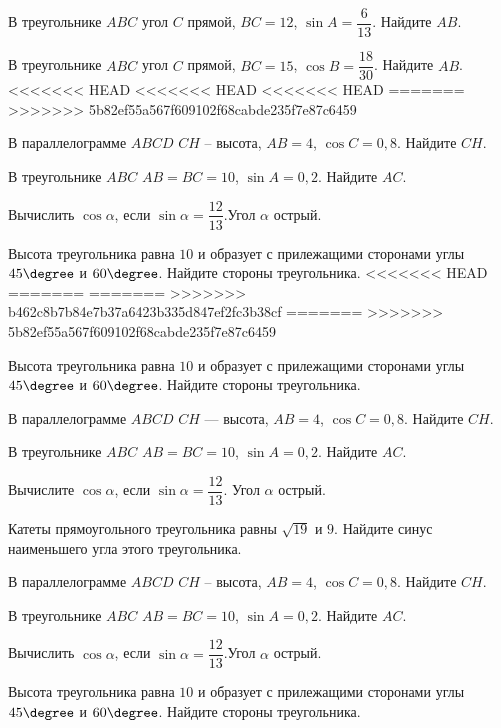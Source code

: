\begin{homework}[number=2]
	\begin{listofex}
		\item В треугольнике \( ABC \) угол \( C \) прямой, \( BC=12 \), \( \sin A=\dfrac{6}{13} \). Найдите \( AB \).
		\item В треугольнике \( ABC \) угол \( C \) прямой, \( BC=15 \), \( \cos B=\dfrac{18}{30} \). Найдите \( AB \).
<<<<<<< HEAD
<<<<<<< HEAD
<<<<<<< HEAD
=======
>>>>>>> 5b82ef55a567f609102f68cabde235f7e87c6459
		\item  В параллелограмме \( ABCD \) \( CH \) – высота, \( AB = 4 \), \( \cos C = 0,8 \). Найдите \( CH \).
		\item  В треугольнике \( ABC \) \( AB = BC = 10 \), \( \sin A = 0,2 \). Найдите \( AC \).
		\item Вычислить \( \cos \alpha \), если \( \sin \alpha =\dfrac{12}{13}\).Угол \( \alpha \) острый.
		\item  Высота треугольника равна \( 10 \) и образует с прилежащими сторонами углы \( 45\degree \) и \( 60\degree \). Найдите стороны треугольника.
<<<<<<< HEAD
=======
=======
>>>>>>> b462c8b7b84e7b37a6423b335d847ef2fc3b38cf
=======
>>>>>>> 5b82ef55a567f609102f68cabde235f7e87c6459
		\item  Высота треугольника равна \( 10 \) и образует с прилежащими сторонами углы \( 45\degree \) и \( 60\degree \). Найдите стороны треугольника.
		\item  В параллелограмме \( ABCD \) \( CH \) --- высота, \( AB = 4 \), \( \cos C = 0,8 \). Найдите \( CH \).
		\item  В треугольнике \( ABC \) \( AB = BC = 10 \), \( \sin A = 0,2 \). Найдите \( AC \).
		\item Вычислите \( \cos \alpha \), если \( \sin \alpha =\dfrac{12}{13} \). Угол \( \alpha \) острый.
		\item Катеты прямоугольного треугольника равны \( \sqrt{19} \) и \( 9 \). Найдите синус наименьшего угла этого треугольника.
		\item  В параллелограмме \( ABCD \) \( CH \) – высота, \( AB = 4 \), \( \cos C = 0,8 \). Найдите \( CH \).
		\item  В треугольнике \( ABC \) \( AB = BC = 10 \), \( \sin A = 0,2 \). Найдите \( AC \).
		\item Вычислить \( \cos \alpha \), если \( \sin \alpha =\dfrac{12}{13}\).Угол \( \alpha \) острый.
		\item  Высота треугольника равна \( 10 \) и образует с прилежащими сторонами углы \( 45\degree \) и \( 60\degree \). Найдите стороны треугольника.
	\end{listofex}
\end{homework}

